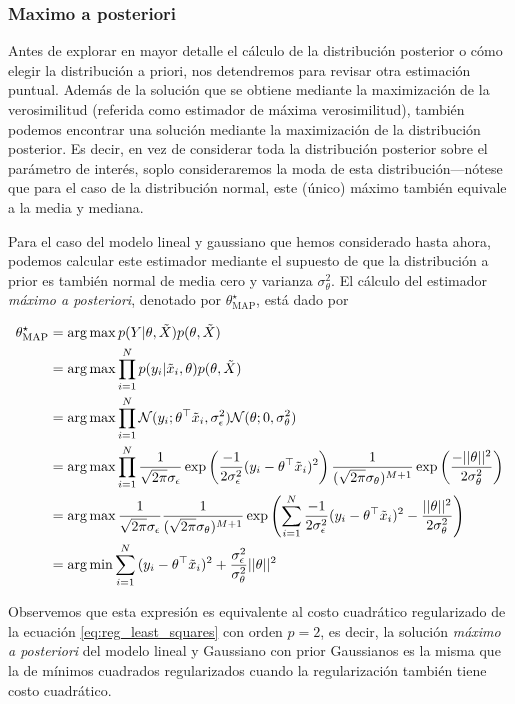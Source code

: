 \subsubsection{Maximo a posteriori} %
\label{sub:map}

Antes de explorar en mayor detalle el cálculo de la distribución posterior o cómo elegir la distribución a priori, nos detendremos para revisar otra estimación puntual. Además de la solución que se obtiene mediante la maximización de la verosimilitud (referida como estimador de máxima verosimilitud), también podemos encontrar una solución mediante la maximización de la distribución posterior. Es decir, en vez de considerar toda la distribución posterior sobre el parámetro de interés, soplo consideraremos la moda de esta distribución---nótese que para el caso de la distribución normal, este (único) máximo también equivale a la media y mediana.

Para el caso del modelo lineal y gaussiano que hemos considerado hasta ahora, podemos calcular este estimador mediante el supuesto de que la distribución a prior es también normal de media cero y varianza $\sigma_\theta^2$. El cálculo del estimador \emph{máximo a posteriori}, denotado por $\theta_\text{MAP}^\star $, está dado por 

\begin{align}
	\theta_\text{MAP}^\star 	&= \operatorname*{arg\,max} p(Y|\theta,\tilde{X})p(\theta,\tilde{X})\nonumber\\
								&= \operatorname*{arg\,max} \prod_{i=1}^Np(y_i|\tilde{x}_i,\theta)p(\theta,\tilde{X})\nonumber\\
								&= \operatorname*{arg\,max} \prod_{i=1}^N {\mathcal N}(y_i;\theta^\top\tilde{x}_i,\sigma_\epsilon^2){\mathcal N}(\theta;0,\sigma_\theta^2) \nonumber\\
								&= \operatorname*{arg\,max} \prod_{i=1}^N \frac{1}{\sqrt{2\pi}\sigma_\epsilon} \exp\left({\frac{-1}{2\sigma_\epsilon^2}(y_i-\theta^\top\tilde{x}_i)^2}\right)
											\frac{1}{(\sqrt{2\pi}\sigma_\theta)^{M+1}} \exp\left({\frac{-||\theta||^2}{2\sigma_\theta^2}}\right) \nonumber\\
								&= \operatorname*{arg\,max}  \frac{1}{\sqrt{2\pi}\sigma_\epsilon} \frac{1}{(\sqrt{2\pi}\sigma_\theta)^{M+1}}
											\exp\left( \sum_{i=1}^N{\frac{-1}{2\sigma_\epsilon^2}(y_i-\theta^\top\tilde{x}_i)^2} -{\frac{||\theta||^2}{2\sigma_\theta^2}}\right) \nonumber\\
								&= \operatorname*{arg\,min} \sum_{i=1}^N{(y_i-\theta^\top\tilde{x}_i)^2} +{\frac{\sigma_\epsilon^2}{\sigma_\theta^2}||\theta||^2}
\end{align}

Observemos que esta expresión es equivalente al costo cuadrático regularizado de la ecuación \eqref{eq:reg_least_squares} con orden $p=2$, es decir, la solución \emph{máximo a posteriori} del modelo lineal y Gaussiano con prior Gaussianos es la misma que la de mínimos cuadrados regularizados cuando la regularización también tiene costo cuadrático. 


